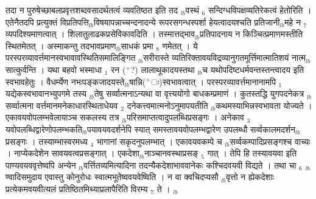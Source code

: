 \documentclass[article,12pt,a4paper]{memoir}%
\newcommand{\add}[1]{($^{+}$#1)}
\newcounter{parCount}
\begin{document}
	  
	  \pstart \leavevmode%
	तदा न पुरुषेच्छाबलप्रवृत्तशब्दवसादर्थतत्वं व्यवतिष्ठत इति तद {\tiny $_{lb}$}वस्थं {\tiny $_{6}$} सन्दिग्धविपक्षव्यतिरेकत्वं हेतोरिति । एतेनैतदपि प्रत्युक्तं विप्रतिपत्ति{\tiny $_{lb}$}विषयापन्नाच्चन्दनादन्ये रूपरसगन्धस्पर्शा हेयत्वादयश्चति प्रतिजानी{\tiny $_{lb}$}महे न {\tiny $_{7}$} व्यपदिश्यमाणत्वात् । शिलातुलाढकप्रसेविकावदिति । तस्मात्तद्भाव{\tiny $_{lb}$}प्रतिपादनाय न किञ्चित्प्रमाणमस्तीति स्थितमेतत् । अस्माकन्तु तदभावप्रमाण{\tiny $_{lb}$}साधकं प्रमा {\tiny $_{8}$} \leavevmode{} णमेतत् । ये परस्परव्यावर्त्तमानस्वभावावस्थितिसमालिङ्गित {\tiny $_{lb}$}सरीरास्ते व्यतिरिक्तावयविद्रव्यानुगतमूर्त्तिमात्मातिशयं नात्म{\tiny $_{lb}$}सात्कुर्वन्ति । यथा बहवो भस्माधा {\tiny $_{1}$} रन \add{?} लालाथूकादयस्तथा {\tiny $_{lb}$}च यथोपदिष्टधर्मवन्तस्तन्त्वादय इति स्वभावहेतुः । वैधर्म्येण नभःपङ्कजादयस्ते{\tiny $_{lb}$}षान्नि\add{ः}स्वभावत्वात् । परस्परव्यावर्त्तमानानामपि {\tiny $_{1}$} यद्येकस्वभावानभ्युपगमे तस्य {\tiny $_{lb}$}तेषु सर्व्वात्मनाऽन्यथा वा वृत्त्ययोगो बाधकम्प्रमाणं । कुतस्तद्धि युगपदनेकत्र {\tiny $_{lb}$}सर्व्वात्मना वर्त्तमानमनेकाधारस्थिताधेयव {\tiny $_{2}$} दनेकत्त्वमात्मनोऽनुमापयतीति {\tiny $_{lb}$}कथमस्याभिन्नस्वभावता योज्यते । एकावयवोपलम्भवेलायाञ्च सकलस्य तत्र {\tiny $_{lb}$}परिसमाप्तत्वादुपलब्धिप्रसङ्गः । अनेकाव {\tiny $_{3}$} यवोपलब्धिद्वारेणोपलम्भकति{\tiny $_{lb}$}पयावयवदर्शनेपि स्यात् समस्तावयवोपलम्भद्वारेण उपलब्धौ सर्व्वकालमदर्शन{\tiny $_{lb}$}प्रसङ्गः । तस्याम्भास्वरमध्य {\tiny $_{4}$} भागानां सकृदनुपलम्भात् । एकावयवकम्पे च {\tiny $_{lb}$}सर्व्वकम्पादिप्रसङ्गश्च वाच्यः । नाप्येकदेशेन सावयवत्वप्रसङ्गात् । एकदेशा{\tiny $_{lb}$}नाञ्चानवस्थाप्रसङ् {\tiny $_{5}$} गात् । तेपि हि तस्यावयवा इति पाण्यवयववृत्तेष्वपि अन्येन {\tiny $_{lb}$}वर्त्तितव्यमित्यादिना तदन्यैकदेशाभाववानेकः कश्चिदवयवी विद्यते । तथा चा {\tiny $_{6}$} {\tiny $_{lb}$}ण्वादिसमुदाय एवास्तु कोनुरोधः स्वात्मभूतेष्ववयवेष्विति । न वा क्वचिदप्यसौ {\tiny $_{lb}$}वृत्तो न ह्येकदेशाः प्रत्येकमवयवीत्यलं प्रतिष्ठितमिथ्याप्रलापैरिति विरम्य {\tiny $_{7}$} ते ।
	{}
	\pend%
      {\tiny $_{lb}$}
\end{document}
